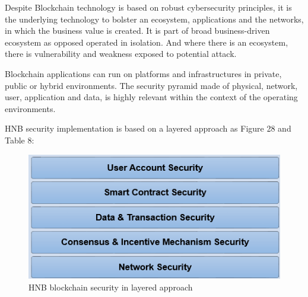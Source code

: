\documentclass[fleqn,10pt]{SelfArx} %
\begin{document}
Despite Blockchain technology is based on robust cybersecurity principles, it is the underlying technology to bolster an ecosystem, applications and the networks, in which the business value is created. It is part of broad business-driven ecosystem as opposed operated in isolation. And where there is an ecosystem, there is vulnerability and weakness exposed to potential attack. 

Blockchain applications can run on platforms and infrastructures in private, public or hybrid environments. The security pyramid made of physical, network, user, application and data, is highly relevant within the context of the operating environments.

HNB security implementation is based on a layered approach as Figure 28 and Table 8:

\begin{figure}[ht]\centering
\includegraphics[width=\linewidth]{29}
\caption{HNB blockchain security in layered approach}
\label{fig:29}
\end{figure}
\end{document}
